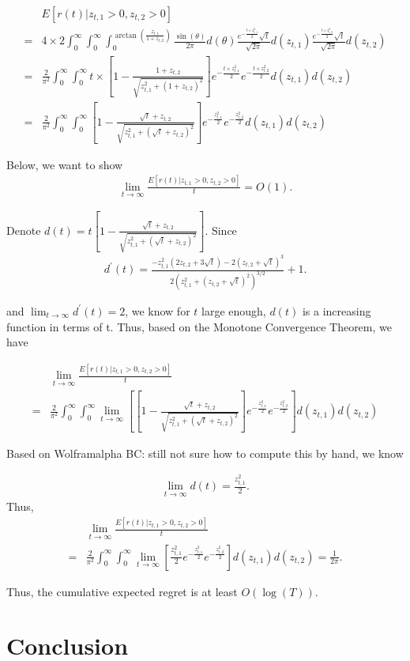\documentclass{article}
\newcommand{\bccomment}[1]{{\color{blue}BC: #1}}
\begin{document}
\begin{align}
&E[r(t)| z_{t,1}>0, z_{t,2}>0] \nonumber \\
=& 4\times 2 \int_{0}^{\infty} \int_{0}^{\infty} \int_{0}^{\arctan\left(\frac{z_{t,1}}{1+z_{t,2}}\right)}\frac{\sin(\theta)}{2\pi}d(\theta)\frac{e^{-\frac{t \times z_{t,1}^2}{2}}\sqrt{t}}{\sqrt{2\pi}}d(z_{t,1})\frac{e^{-\frac{t \times z_{t,2}^2}{2}}\sqrt{t}}{\sqrt{2\pi}}d(z_{t,2}) \nonumber \\
=& \frac{2}{\pi^2}\int_{0}^{\infty} \int_{0}^{\infty}t\times \left[1-\frac{1+z_{t,2}}{\sqrt{z_{t,1}^2+(1+z_{t,2})^2}}\right]e^{-\frac{t \times z_{t,1}^2}{2}}e^{-\frac{t \times z_{t,2}^2}{2}}d(z_{t,1})d(z_{t,2}) \nonumber \\
=& \frac{2}{\pi^2}\int_{0}^{\infty} \int_{0}^{\infty} \left[1-\frac{\sqrt{t}+z_{t,2}}{\sqrt{z_{t,1}^2+(\sqrt{t}+z_{t,2})^2}}\right]e^{-\frac{z_{t,1}^2}{2}}e^{-\frac{z_{t,2}^2}{2}}d(z_{t,1})d(z_{t,2}) \nonumber 
\end{align}

Below, we want to show 
\begin{align}
\lim_{t\rightarrow\infty}\frac{E[r(t)| z_{t,1}>0, z_{t,2}>0]}{t} = O(1). \nonumber
\end{align}

Denote $d(t)=t\left[1-\frac{\sqrt{t}+z_{t,2}}{\sqrt{z_{t,1}^2+(\sqrt{t}+z_{t,2})^2}}\right]$.
Since
\begin{align}
d^{'}(t)=\frac{-z_{t,1}^2(2z_{t,2}+3\sqrt{t})-2(z_{t,2}+\sqrt{t})^3}{2(z_{t,1}^2+(z_{t,2}+\sqrt{t})^2)^{3/2}}+1. \nonumber
\end{align}

and $\lim_{t\rightarrow \infty}d^{'}(t)=2$, we know for $t$ large enough, $d(t)$ is a increasing function in terms of t. Thus, based on the Monotone Convergence Theorem, we have

\begin{align}
&\lim_{t\rightarrow \infty}\frac{E[r(t)| z_{t,1}>0, z_{t,2}>0]}{t} \nonumber \\
=& \frac{2}{\pi^2}\int_{0}^{\infty} \int_{0}^{\infty}\lim_{t\rightarrow \infty}\left[ \left[1-\frac{\sqrt{t}+z_{t,2}}{\sqrt{z_{t,1}^2+(\sqrt{t}+z_{t,2})^2}}\right]e^{-\frac{z_{t,1}^2}{2}}e^{-\frac{z_{t,2}^2}{2}}\right]d(z_{t,1})d(z_{t,2}) \nonumber  
\end{align}


Based on Wolframalpha \bccomment{still not sure how to compute this by hand}, we know

\begin{align}
\lim_{t\rightarrow \infty} d(t)=\frac{z_{t,1}^2}{2}. \nonumber
\end{align}
Thus,
\begin{align}
&\lim_{t\rightarrow \infty}\frac{E[r(t)| z_{t,1}>0, z_{t,2}>0]}{t} \nonumber \\
=&\frac{2}{\pi^2}\int_{0}^{\infty} \int_{0}^{\infty}\lim_{t\rightarrow \infty}\left[ \frac{z_{t,1}^2}{2}e^{-\frac{z_{t,1}^2}{2}}e^{-\frac{z_{t,2}^2}{2}}\right]d(z_{t,1})d(z_{t,2}) = \frac{1}{2\pi}. \nonumber
\end{align}


Thus, the cumulative expected regret is at least $O(\log(T))$.


\section{Conclusion}


{}

\end{document}
